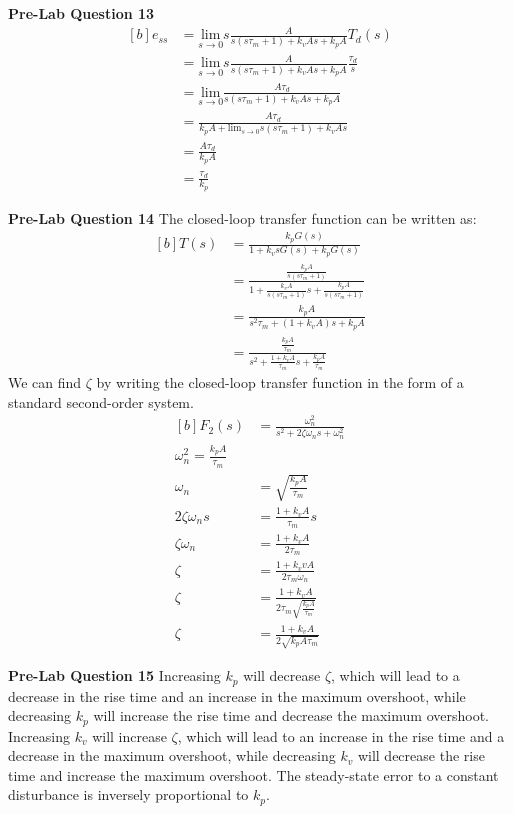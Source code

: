 \documentclass[12pt]{article}
\begin{document}
\textbf{Pre-Lab Question 13}
\begin{equation}
\begin{aligned}[b]
    e_{ss} &= \underset{s \rightarrow 0}{\text{lim}}s\frac{A}{s(s\tau_m+1) + k_vAs + k_pA}T_d(s) \\
    &= \underset{s \rightarrow 0}{\text{lim}}s\frac{A}{s(s\tau_m+1) + k_vAs + k_pA}\frac{\tau_d}{s} \\
    &= \underset{s \rightarrow 0}{\text{lim}}\frac{A\tau_d}{s(s\tau_m+1) + k_vAs + k_pA} \\
    &= \frac{A\tau_d}{k_pA + \text{lim}_{s \rightarrow 0} s(s\tau_m+1) + k_vAs} \\
    &= \frac{A\tau_d}{k_pA} \\
    &= \frac{\tau_d}{k_p}
\end{aligned}
\end{equation} 

\textbf{Pre-Lab Question 14}
The closed-loop transfer function can be written as:
\begin{equation*}
\begin{aligned}[b]
    T(s) &= \frac{k_pG(s)}{1 + k_vsG(s) + k_pG(s)} \\
    &= \frac{\frac{k_pA}{s(s\tau_m + 1)}}{1 + \frac{k_vA}{s(s\tau_m + 1)}s + \frac{k_pA}{s(s\tau_m + 1)}} \\
    &= \frac{k_pA}{s^2\tau_m + (1 + k_vA)s + k_pA} \\
    &= \frac{\frac{k_pA}{\tau_m}}{s^2 + \frac{1 + k_vA}{\tau_m}s + \frac{k_pA}{\tau_m}} 
\end{aligned}
\end{equation*}
We can find $\zeta$ by writing the closed-loop transfer function in the form of a standard second-order system.
\begin{equation*}
\begin{aligned}[b]
    F_2(s) &= \frac{\omega_n^2}{s^2 + 2\zeta\omega_ns + \omega_n^2} \\
    \omega_n^2 = \frac{k_pA}{\tau_m} \\
    \omega_n &= \sqrt{\frac{k_pA}{\tau_m}} \\
    2\zeta\omega_ns &= \frac{1+k_vA}{\tau_m}s \\
    \zeta\omega_n &= \frac{1+k_vA}{2\tau_m} \\
    \zeta &= \frac{1+k_vvA}{2\tau_m\omega_n} \\
    \zeta &= \frac{1+k_vA}{2\tau_m\sqrt{\frac{k_pA}{\tau_m}}} \\
    \zeta &= \frac{1+k_vA}{2\sqrt{k_pA\tau_m}}
\end{aligned}
\end{equation*}

\textbf{Pre-Lab Question 15}
Increasing $k_p$ will decrease $\zeta$, which will lead to a decrease in the rise time and an increase in the maximum overshoot, while decreasing $k_p$ will increase the rise time and decrease the maximum overshoot. Increasing $k_v$ will increase $\zeta$, which will lead to an increase in the rise time and a decrease in the maximum overshoot, while decreasing $k_v$ will decrease the rise time and increase the maximum overshoot. The steady-state error to a constant disturbance is inversely proportional to $k_p$. %
\end{document}
